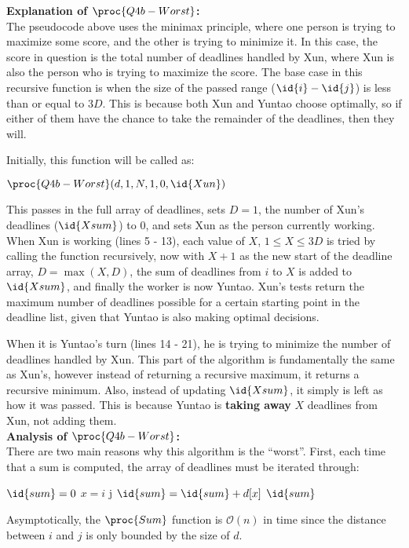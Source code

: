     \vspace{7mm}
    \textbf{Explanation of $\proc{Q4b-Worst}$:}\\
    The pseudocode above uses the minimax principle, where one person is trying to maximize some score, and the other is trying to minimize it.
    In this case, the score in question is the total number of deadlines handled by Xun, where Xun is also the person who is trying to maximize the score.
    The base case in this recursive function is when the size of the passed range ($\id{i} - \id{j}$) is less than or equal to $3D$.
    This is because both Xun and Yuntao choose optimally, so if either of them have the chance to take the remainder of the deadlines, then they will.

    Initially, this function will be called as:
    \begin{center}
        $\proc{Q4b-Worst}(d, 1, N, 1, 0, \id{Xun})$
    \end{center}
    This passes in the full array of deadlines, sets $D = 1$, the number of Xun's deadlines ($\id{Xsum}$) to 0, and sets Xun as the person currently working.
    When Xun is working (lines 5 - 13), each value of $X$, $1 \le X \le 3D$ is tried by calling the function recursively,
    now with $X + 1$ as the new start of the deadline array, $D = \max(X, D)$, the sum of deadlines from $i$ to $X$ is added to $\id{Xsum}$, and finally the worker is now Yuntao.
    Xun's tests return the maximum number of deadlines possible for a certain starting point in the deadline list, given that Yuntao is also making optimal decisions.

    When it is Yuntao's turn (lines 14 - 21), he is trying to minimize the number of deadlines handled by Xun.
    This part of the algorithm is fundamentally the same as Xun's, however instead of returning a recursive maximum, it returns a recursive minimum.
    Also, instead of updating $\id{Xsum}$, it simply is left as how it was passed. This is because Yuntao is \textbf{taking away} $X$ deadlines from Xun,
    not adding them. \\


    \textbf{Analysis of $\proc{Q4b-Worst}$:}\\
    There are two main reasons why this algorithm is the ``worst''.
    First, each time that a sum is computed, the array of deadlines must be iterated through:

    \begin{spacing}{1.2}
        \begin{codebox}
            \li $\id{sum} = 0$
            \li \For $x = i$ \To j
            \Do
                \li $\id{sum} = \id{sum} + d[x]$
            \End
            \li \Return $\id{sum}$
        \end{codebox}
    \end{spacing}
    \vspace{5mm}
    Asymptotically, the $\proc{Sum}$ function is $\mathcal{O}(n)$ in time since the distance between $i$ and $j$ is only bounded by the size of $d$.

